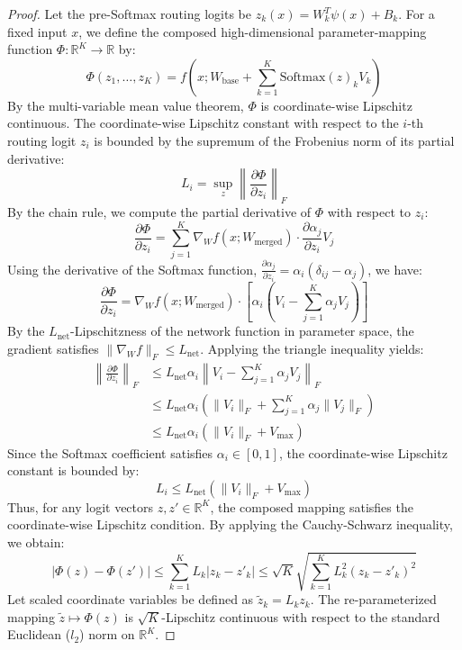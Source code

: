 \begin{proof}
Let the pre-Softmax routing logits be $z_k(x) = W_k^T \psi(x) + B_k$. For a fixed input $x$, we define the composed high-dimensional parameter-mapping function $\Phi: \mathbb{R}^K \to \mathbb{R}$ by:
\begin{equation}
    \Phi(z_1, \dots, z_K) = f\left(x; W_{\text{base}} + \sum_{k=1}^K \text{Softmax}(z)_k V_k\right)
\end{equation}
By the multi-variable mean value theorem, $\Phi$ is coordinate-wise Lipschitz continuous. The coordinate-wise Lipschitz constant with respect to the $i$-th routing logit $z_i$ is bounded by the supremum of the Frobenius norm of its partial derivative:
\begin{equation}
    L_i = \sup_{z} \left\| \frac{\partial \Phi}{\partial z_i} \right\|_F
\end{equation}
By the chain rule, we compute the partial derivative of $\Phi$ with respect to $z_i$:
\begin{equation}
    \frac{\partial \Phi}{\partial z_i} = \sum_{j=1}^K \nabla_W f(x; W_{\text{merged}}) \cdot \frac{\partial \alpha_j}{\partial z_i} V_j
\end{equation}
Using the derivative of the Softmax function, $\frac{\partial \alpha_j}{\partial z_i} = \alpha_i \left( \delta_{ij} - \alpha_j \right)$, we have:
\begin{equation}
    \frac{\partial \Phi}{\partial z_i} = \nabla_W f(x; W_{\text{merged}}) \cdot \left[ \alpha_i \left( V_i - \sum_{j=1}^K \alpha_j V_j \right) \right]
\end{equation}
By the $L_{\text{net}}$-Lipschitzness of the network function in parameter space, the gradient satisfies $\|\nabla_W f\|_F \le L_{\text{net}}$. Applying the triangle inequality yields:
\begin{align}
    \left\| \frac{\partial \Phi}{\partial z_i} \right\|_F &\le L_{\text{net}} \alpha_i \left\| V_i - \sum_{j=1}^K \alpha_j V_j \right\|_F \\
    &\le L_{\text{net}} \alpha_i \left( \|V_i\|_F + \sum_{j=1}^K \alpha_j \|V_j\|_F \right) \\
    &\le L_{\text{net}} \alpha_i \left( \|V_i\|_F + V_{\max} \right)
\end{align}
Since the Softmax coefficient satisfies $\alpha_i \in [0, 1]$, the coordinate-wise Lipschitz constant is bounded by:
\begin{equation}
    L_i \le L_{\text{net}} \left( \|V_i\|_F + V_{\max} \right)
\end{equation}
Thus, for any logit vectors $z, z' \in \mathbb{R}^K$, the composed mapping satisfies the coordinate-wise Lipschitz condition. By applying the Cauchy-Schwarz inequality, we obtain:
\begin{equation}
    \left| \Phi(z) - \Phi(z') \right| \le \sum_{k=1}^K L_k |z_k - z'_k| \le \sqrt{K} \sqrt{\sum_{k=1}^K L_k^2 (z_k - z'_k)^2}
\end{equation}
Let scaled coordinate variables be defined as $\tilde{z}_k = L_k z_k$. The re-parameterized mapping $\tilde{z} \mapsto \Phi(z)$ is $\sqrt{K}$-Lipschitz continuous with respect to the standard Euclidean ($l_2$) norm on $\mathbb{R}^K$.


\end{proof}
